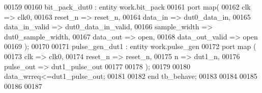 \begin{DoxyCode}
00159   
00160   bit\_pack\_dut0 : \textcolor{keywordflow}{entity} work.bit_pack 
00161 \textcolor{keywordflow}{port} \textcolor{keywordflow}{map}(
00162         clk             => clk0,
00163         reset_n         => reset_n,
00164         data_in         => dut0_data_in,
00165         data_in_valid   => dut0_data_in_valid,
00166         sample_width    => dut0_sample_width,
00167         data_out        => \textcolor{keywordflow}{open},
00168         data_out_valid  => \textcolor{keywordflow}{open}
00169 \textcolor{vhdlchar}{)};  
00170 
00171 pulse\_gen\_dut1 : \textcolor{keywordflow}{entity} work.pulse_gen
00172 \textcolor{keywordflow}{port} \textcolor{keywordflow}{map} (
00173          clk         => clk0,
00174          reset_n     => reset_n,
00175          n           => dut1_n, 
00176          pulse\_out   => dut1_pulse_out
00177                
00178 \textcolor{vhdlchar}{)};
00179 
00180 \textcolor{vhdlchar}{data_wrreq}\textcolor{vhdlchar}{<=}\textcolor{vhdlchar}{dut1_pulse_out};
00181 
00182     \textcolor{keywordflow}{end} \textcolor{vhdlchar}{tb\_behave};
00183   
00184   
00185 
00186 
00187   
\end{DoxyCode}

